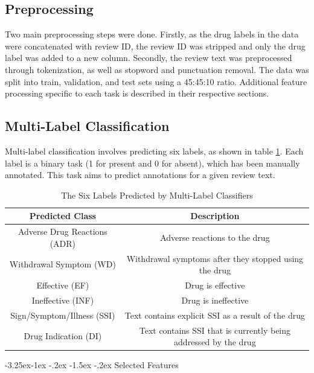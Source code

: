 \documentclass[10.7pt, onecolumn]{article}
\makeatletter
\renewcommand\subsubsection{\@startsection{subsubsection}{3}{\z@}%
	{-3.25ex\@plus -1ex \@minus -.2ex}%
    {-1.5ex \@plus -.2ex}%
    {\normalfont\itshape}}
\makeatother
\begin{document}
\subsection{Preprocessing}
Two main preprocessing steps were done. Firstly, as the drug labels in the data were concatenated with review ID, the review ID was stripped and only the drug label was added to a new column. Secondly, the review text was preprocessed through tokenization, as well as stopword and punctuation removal. The data was split into train, validation, and test sets using a 45:45:10 ratio. Additional feature processing specific to each task is described in their respective sections.
\subsection{Multi-Label Classification}
Multi-label classification involves predicting six labels, as shown in table \ref{tab:6Labels}. Each label is a binary task (1 for present and 0 for absent), which has been manually annotated. This task aims to predict annotations for a given review text.

\begin{table}[H]
  \centering
  \small
  \begin{tabular}{|c|c|}
    \hline
    \textbf{Predicted Class} & \textbf{Description} \\
    \hline
    Adverse Drug Reactions (ADR) & Adverse reactions to the drug \\
    \hline
    Withdrawal Symptom (WD) & Withdrawal symptoms after they stopped using the drug \\
    \hline
    Effective (EF) & Drug is effective \\
    \hline
    Ineffective (INF) & Drug is ineffective\\
    \hline
    Sign/Symptom/Illness (SSI) & Text contains explicit SSI as a result of the drug \\
    \hline
    Drug Indication (DI) & Text contains SSI that is currently being addressed by the drug \\
    \hline
  \end{tabular}
  \caption{The Six Labels Predicted by Multi-Label Classifiers}
  \label{tab:6Labels}
\end{table}

\subsubsection{Selected Features}
\end{document}
